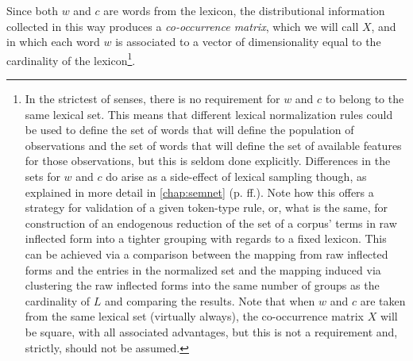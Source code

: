 Since both $w$ and $c$ are words from the lexicon, the distributional information collected in this way produces a \emph{co-occurrence matrix}, which we will call $X$, and in which each word $w$ is associated to a vector of dimensionality equal to the cardinality of the lexicon\footnote{
    \label{foot:contextset}
    In the strictest of senses, there is no requirement for $w$ and $c$ to belong to the same lexical set.
    This means that different lexical normalization rules could be used to define the set of words that will define the population of observations and the set of words that will define the set of available features for those observations, but this is seldom done explicitly.
    Differences in the sets for $w$ and $c$ do arise as a side-effect of lexical sampling though, as explained in more detail in \autoref{chap:semnet} (p. \pageref{pp:features}ff.).
    Note how this offers a strategy for validation of a given token-type rule, or, what is the same, for construction of an endogenous reduction of the set of a corpus' terms in raw inflected form into a tighter grouping with regards to a fixed lexicon.
    This can be achieved via a comparison between the mapping from raw inflected forms and the entries in the normalized set and the mapping induced via clustering the raw inflected forms into the same number of groups as the cardinality of $L$ and comparing the results.
    Note that when $w$ and $c$ are taken from the same lexical set (virtually always), the co-occurrence matrix $X$ will be square, with all associated advantages, but this is not a requirement and, strictly, should not be assumed.
}.

